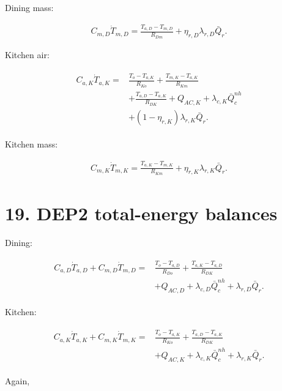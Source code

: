 \documentclass[11pt]{article}
\begin{document}
Dining mass:

\begin{align}
\boxed{
C_{m,D}\dot T_{m,D}
=
\frac{T_{a,D}-T_{m,D}}{R_{Dm}}
+
\eta_{r,D}
\lambda_{r,D}\bar Q_r.
}
\tag{61}
\end{align}

Kitchen air:

\begin{align}
\boxed{
\begin{aligned}
C_{a,K}\dot T_{a,K}
={}&
\frac{T_o-T_{a,K}}{R_{Ko}}
+
\frac{T_{m,K}-T_{a,K}}{R_{Km}}\\
&+
\frac{T_{a,D}-T_{a,K}}{R_{DK}}
+
Q_{AC,K}
+
\lambda_{c,K}\bar Q_c^{nh}\\
&+
(1-\eta_{r,K})
\lambda_{r,K}\bar Q_r.
\end{aligned}
}
\tag{62}
\end{align}

Kitchen mass:

\begin{align}
\boxed{
C_{m,K}\dot T_{m,K}
=
\frac{T_{a,K}-T_{m,K}}{R_{Km}}
+
\eta_{r,K}
\lambda_{r,K}\bar Q_r.
}
\tag{63}
\end{align}

\section*{19. DEP2 total-energy balances}

Dining:

\begin{align}
\boxed{
\begin{aligned}
C_{a,D}\dot T_{a,D}
+
C_{m,D}\dot T_{m,D}
={}&
\frac{T_o-T_{a,D}}{R_{Do}}
+
\frac{T_{a,K}-T_{a,D}}{R_{DK}}\\
&+
Q_{AC,D}
+
\lambda_{c,D}\bar Q_c^{nh}
+
\lambda_{r,D}\bar Q_r.
\end{aligned}
}
\tag{64}
\end{align}

Kitchen:

\begin{align}
\boxed{
\begin{aligned}
C_{a,K}\dot T_{a,K}
+
C_{m,K}\dot T_{m,K}
={}&
\frac{T_o-T_{a,K}}{R_{Ko}}
+
\frac{T_{a,D}-T_{a,K}}{R_{DK}}\\
&+
Q_{AC,K}
+
\lambda_{c,K}\bar Q_c^{nh}
+
\lambda_{r,K}\bar Q_r.
\end{aligned}
}
\tag{65}
\end{align}

Again,
\end{document}
